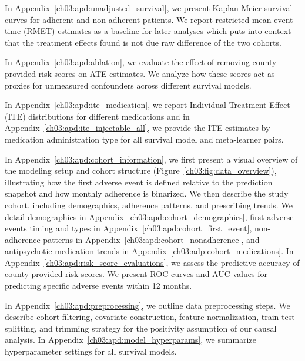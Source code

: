 In Appendix~\ref{ch03:apd:unadjusted_survival}, we present Kaplan-Meier survival curves for adherent and non-adherent patients.  
We report restricted mean event time (RMET) estimates as a baseline for later analyses which puts into context that the treatment effects found is not due raw difference of the two cohorts.

In Appendix~\ref{ch03:apd:ablation}, we evaluate the effect of removing county-provided risk scores on ATE estimates.  
We analyze how these scores act as proxies for unmeasured confounders across different survival models.  

In Appendix~\ref{ch03:apd:ite_medication}, we report Individual Treatment Effect (ITE) distributions for different medications and in Appendix~\ref{ch03:apd:ite_injectable_all}, we provide the ITE estimates by medication administration type for all survival model and meta-learner pairs. 

In Appendix~\ref{ch03:apd:cohort_information}, we first present a visual overview of the modeling setup and cohort structure (Figure~\ref{ch03:fig:data_overview}), illustrating how the first adverse event is defined relative to the prediction snapshot and how monthly adherence is binarized. 
We then describe the study cohort, including demographics, adherence patterns, and prescribing trends.  
We detail demographics in Appendix~\ref{ch03:apd:cohort_demographics}, first adverse events timing and types in Appendix~\ref{ch03:apd:cohort_first_event},  
non-adherence patterns in Appendix~\ref{ch03:apd:cohort_nonadherence}, and antipsychotic medication trends in Appendix~\ref{ch03:adp:cohort_medications}.  
In Appendix~\ref{ch03:apd:risk_score_evaluations}, we assess the predictive accuracy of county-provided risk scores.  
We present ROC curves and AUC values for predicting specific adverse events within 12 months. 

In Appendix~\ref{ch03:apd:preprocessing}, we outline data preprocessing steps.  
We describe cohort filtering, covariate construction, feature normalization, train-test splitting, and trimming strategy for the positivity assumption of our causal analysis.  
In Appendix~\ref{ch03:apd:model_hyperparams}, we summarize hyperparameter settings for all survival models.  


